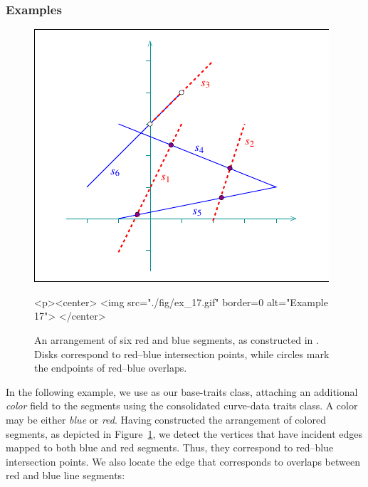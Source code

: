 \subsubsection{Examples}

\begin{figure}[t]
\begin{ccTexOnly}
  \begin{center}
  \includegraphics{Arrangement_on_surface_2/fig/ex_17}
  \end{center}
\end{ccTexOnly}
\begin{ccHtmlOnly}
  <p><center>
  <img src="./fig/ex_17.gif" border=0 alt="Example 17">
  </center>
\end{ccHtmlOnly}
\caption{An arrangement of six red and blue segments, as
constructed in . Disks correspond to
red--blue intersection points, while circles mark the endpoints
of red--blue overlaps.\label{arr_fig:ex_17}}
\end{figure}

In the following example, we use  as our
base-traits class, attaching an additional {\em color} field to
the segments using the consolidated curve-data traits class. A
color may be either {\em blue} or {\em red}. Having constructed
the arrangement of colored segments, as depicted in
Figure~\ref{arr_fig:ex_17}, we detect the vertices that have incident 
edges mapped to both blue and red segments. Thus, they correspond
to red--blue intersection points. We also locate the edge that
corresponds to overlaps between red and blue line segments:

